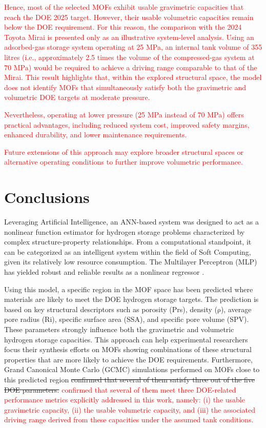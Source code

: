 \documentclass[review]{elsarticle}
\begin{document}
{\textcolor{red}{
Hence, most of the selected MOFs exhibit usable gravimetric capacities that reach the DOE 2025 target.
However, their usable volumetric capacities remain below the DOE requirement.
For this reason, the comparison with the 2024 Toyota Mirai is presented only as an illustrative system-level analysis.
Using an adsorbed-gas storage system operating at 25 MPa, an internal tank volume of 355 litres
(i.e., approximately 2.5 times the volume of the compressed-gas system at 70 MPa)
would be required to achieve a driving range comparable to that of the Mirai.
This result highlights that, within the explored structural space, the model does not identify MOFs
that simultaneously satisfy both the gravimetric and volumetric DOE targets at moderate pressure.}

\textcolor{red}{
Nevertheless, operating at lower pressure (25 MPa instead of 70 MPa) offers practical advantages,
including reduced system cost, improved safety margins, enhanced durability, and lower maintenance requirements.}

\textcolor{red}{Future extensions of this approach may explore broader structural spaces or alternative operating conditions to further improve volumetric performance.
}

\section{Conclusions}

Leveraging Artificial Intelligence, an ANN-based system was designed to act as a nonlinear function estimator for hydrogen storage problems characterized by complex structure-property relationships. From a computational standpoint, it can be categorized as an intelligent system within the field of Soft Computing, given its relatively low resource consumption. The Multilayer Perceptron (MLP) has yielded robust and reliable results as a nonlinear regressor \cite{goodfellow2016deep}.

Using this model, a specific region in the MOF space has been predicted where materials are likely to meet the DOE hydrogen storage targets. The prediction is based on key structural descriptors such as porosity (Prs), density ($\mathrm{\rho}$), average pore radius (Ri), specific surface area (SSA), and specific pore volume (SPV). These parameters strongly influence both the gravimetric and volumetric hydrogen storage capacities. This approach can help experimental researchers focus their synthesis efforts on MOFs showing combinations of these structural properties that are more likely to achieve the DOE requirements. Furthermore, Grand Canonical Monte Carlo (GCMC) simulations performed on MOFs close to this predicted region \sout{confirmed that several of them satisfy three out of the five DOE parameters.} \textcolor{red}{
confirmed that several of them meet three DOE-related performance metrics explicitly addressed in this work, namely:
(i) the usable gravimetric capacity,
(ii) the usable volumetric capacity,
and (iii) the associated driving range derived from these capacities under the assumed tank conditions.}

}
\end{document}
